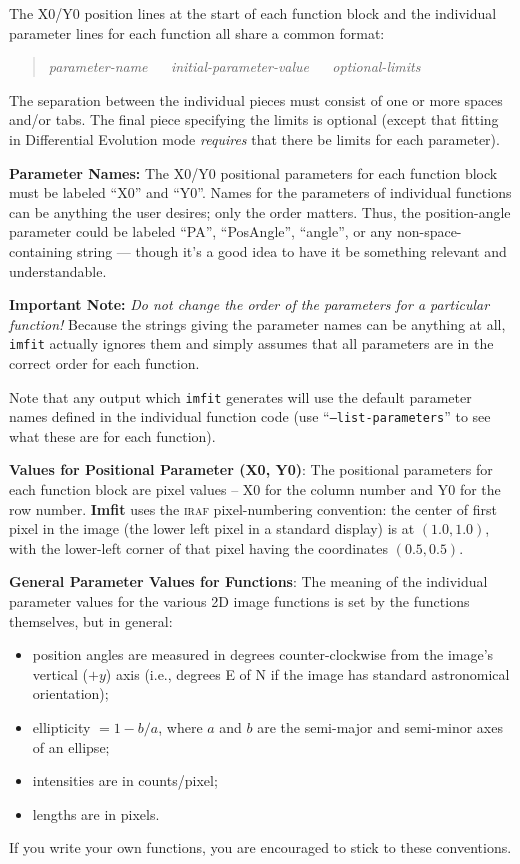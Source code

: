 \documentclass[10pt,a4paper,article]{memoir}
\newcommand{\Imfit}{\textbf{Imfit}}
\newcommand{\imfitprog}{\texttt{imfit}}
\begin{document}
The X0/Y0 position lines at the start of each function block and the
individual parameter lines for each function all share a common format:
\begin{quote}
\textit{parameter-name} ~~ \textit{initial-parameter-value} ~~ \textit{optional-limits}
\end{quote}
The separation between the individual pieces must consist of one or more spaces
and/or tabs. The final piece specifying the limits is optional (except that
fitting in Differential Evolution mode \textit{requires} that there be limits
for each parameter).

\bigskip

\textbf{Parameter Names:} The X0/Y0 positional parameters for each
function block must be labeled ``X0'' and ``Y0''. Names for the
parameters of individual functions can be anything the user desires;
only the order matters. Thus, the position-angle parameter could be
labeled ``PA'', ``PosAngle'', ``angle'', or any non-space-containing
string --- though it's a good idea to have it be something relevant
and understandable.

\textbf{Important Note:} \textit{Do not change the order of the parameters
for a particular function!}  Because the strings giving the parameter names
can be anything at all, \imfitprog{} actually ignores them and simply assumes
that all parameters are in the correct order for each function.

Note that any output which \imfitprog{} generates will use the default parameter
names defined in the individual function code (use ``\texttt{--list-parameters}''
to see what these are for each function).

\bigskip

\textbf{Values for Positional Parameter (X0, Y0)}: The positional parameters
for each function block are pixel values -- X0 for the column number and
Y0 for the row number. \Imfit{} uses the \textsc{iraf} pixel-numbering
convention: the center of first pixel in the image (the lower left pixel
in a standard display) is at $(1.0,1.0)$, with the lower-left corner of that
pixel having the coordinates $(0.5,0.5)$.

\bigskip

\textbf{General Parameter Values for Functions}: The meaning of the individual
parameter values for the various 2D image functions is set by the functions
themselves, but in general: 
\begin{itemize}
\item position angles are measured in degrees counter-clockwise
from the image's vertical ($+y$) axis (i.e., degrees E of N if the image has standard
astronomical orientation);
\item ellipticity $= 1 - b/a$, where $a$ and $b$ are the
semi-major and semi-minor axes of an ellipse;
\item intensities are in counts/pixel;
\item lengths are in pixels. 
\end{itemize}
If you write your own functions, you are encouraged
to stick to these conventions.
\end{document}
